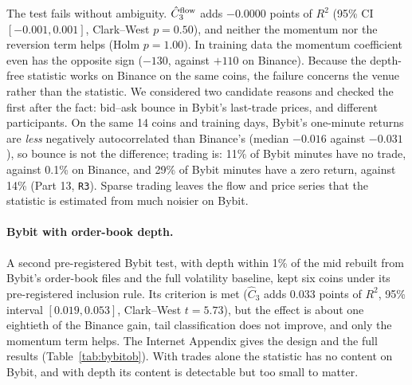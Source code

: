 \documentclass[12pt]{article}
\theoremstyle{definition}
\theoremstyle{remark}
\begin{document}
The test fails without ambiguity. $\hat C_3^{\rm flow}$ adds $-0.0000$ points of $R^2$ (95\% CI $[-0.001,0.001]$, Clark--West $p=0.50$), and neither the momentum nor the reversion term helps (Holm $p=1.00$). In training data the momentum coefficient even has the opposite sign ($-130$, against $+110$ on Binance). Because the depth-free statistic works on Binance on the same coins, the failure concerns the venue rather than the statistic. We considered two candidate reasons and checked the first after the fact: bid--ask bounce in Bybit's last-trade prices, and different participants. On the same 14 coins and training days, Bybit's one-minute returns are \emph{less} negatively autocorrelated than Binance's (median $-0.016$ against $-0.031$), so bounce is not the difference; trading is: 11\% of Bybit minutes have no trade, against 0.1\% on Binance, and 29\% of Bybit minutes have a zero return, against 14\% (Part 13, \texttt{R3}). Sparse trading leaves the flow and price series that the statistic is estimated from much noisier on Bybit.


\paragraph{Bybit with order-book depth.} A second pre-registered Bybit test, with depth within 1\% of the mid rebuilt from Bybit's order-book files and the full volatility baseline, kept six coins under its pre-registered inclusion rule. Its criterion is met ($\hat C_3$ adds $0.033$ points of $R^2$, 95\% interval $[0.019,0.053]$, Clark--West $t=5.73$), but the effect is about one eightieth of the Binance gain, tail classification does not improve, and only the momentum term helps. The Internet Appendix gives the design and the full results (Table~\ref{tab:bybitob}). With trades alone the statistic has no content on Bybit, and with depth its content is detectable but too small to matter.
\end{document}
